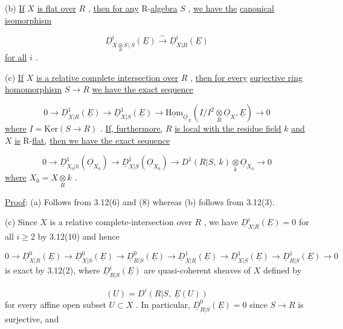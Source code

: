 (b)  \underline{If}  $X$  \underline{is flat over}  $R$ , \underline{then for any} R-\underline{algebra}  $S$ , \underline{we have the} \underline{canonical isomorphism}

\begin{equation*}
\underline{D}^i_{X\underset{R}{\otimes}S\,|\,S}(\underline{E}) \overset{\sim}{\to} \underline{D}^i_{X|R}(\underline{E})
\end{equation*}
\underline{for all}  $i$ .

(c)  \underline{If}  $X$  \underline{is a relative complete intersection over}  $R$ , \underline{then for every} \underline{surjective ring homomorphism}  $S \to R$  \underline{we have the exact sequence}

\begin{equation*}
0 \to \underline{D}^1_{X|R}(\underline{E}) \to \underline{D}^1_{X|S}(\underline{E}) \to \underline{\mathrm{Hom}}_{\underline{O}_X}(I/I^2\underset{R}{\otimes}\underline{O}_X, \underline{E}) \to 0
\end{equation*}
\underline{where}  $I = \mathrm{Ker}(S \to R)$ . \underline{If, furthermore,}  $R$  \underline{is local with the residue field}  $k$ \underline{and}  $X$  \underline{is} R-\underline{flat,} \underline{then we have the exact sequence}

\begin{equation*}
0 \to \underline{D}^1_{X_0|h}(\underline{O}_{X_0}) \to \underline{D}^1_{X|S}(\underline{O}_{X_0}) \to D^1(R|S,\ k)\underset{k}{\otimes}\underline{O}_{X_0} \to 0
\end{equation*}
\underline{where}  $X_0 = X\underset{R}{\otimes}k$ .

\underline{Proof}:  (a)  Follows from 3.12(6) and (8) whereas (b) follows from 3.12(3).

(c)  Since  $X$  is a relative complete-intersection over  $R$ , we have $\underline{D}^i_{X|R}(\underline{E}) = 0$  for all  $i \geq 2$  by 3.12(10) and hence

\begin{equation*}
0 \to \underline{D}^0_{X|R}(\underline{E}) \to \underline{D}^0_{X|S}(\underline{E}) \to \underline{D}^0_{R|S}(\underline{E}) \to \underline{D}^1_{X|R}(\underline{E}) \to \underline{D}^1_{X|S}(\underline{E}) \to \underline{D}^1_{R|S}(\underline{E}) \to 0
\end{equation*}
is exact by 3.12(2), where  $\underline{D}^i_{R|S}(\underline{E})$  are quasi-coherent sheaves of  $X$  defined by

\begin{equation*}
[\underline{D}^i_{R|S}(\underline{E})](U) = D^i(R|S,\ \underline{E}(U))
\end{equation*}
for every affine open subset  $U \subset X$ . In particular,  $\underline{D}^0_{R|S}(\underline{E}) = 0$  since  $S \to R$ is surjective, and

